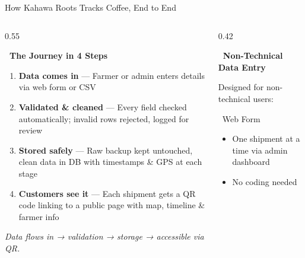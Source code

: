\documentclass[aspectratio=169]{beamer}
\begin{document}
\begin{frame}{How Kahawa Roots Tracks Coffee, End to End}
\small
\begin{columns}[T]

\begin{column}{0.55\textwidth}

\textbf{\faRoute\ The Journey in 4 Steps}
\vspace{0.2em}

\begin{enumerate}\setlength{\itemsep}{2pt}
    \item \textbf{Data comes in} — Farmer or admin enters details via web form or CSV
    \item \textbf{Validated \& cleaned} — Every field checked automatically; invalid rows rejected, logged for review
    \item \textbf{Stored safely} — Raw backup kept untouched, clean data in DB with timestamps \& GPS at each stage
    \item \textbf{Customers see it} — Each shipment gets a QR code linking to a public page with map, timeline \& farmer info
\end{enumerate}

\vspace{0.2em}
{\scriptsize\textit{Data flows in → validation → storage → accessible via QR.}}

\end{column}

\begin{column}{0.42\textwidth}

\textbf{\faUserFriends\ Non-Technical Data Entry}

\vspace{0.1em}
{\scriptsize Designed for non-technical users:}

\vspace{0.2em}
\begin{block}{\faWpforms\ Web Form}
    \begin{itemize}\setlength{\itemsep}{0pt}
        \item One shipment at a time via admin dashboard
        \item No coding needed
    \end{itemize}
    \vspace{-0.4em}
\end{block}


\end{column}
\end{columns}
\end{frame}
\end{document}
